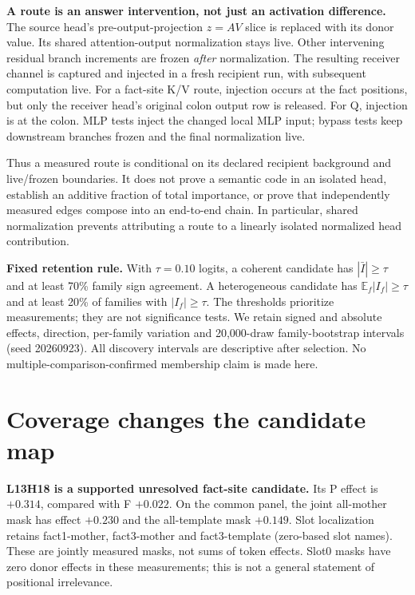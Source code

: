 \documentclass[11pt,a4paper]{article}
\newcommand{\E}{\mathbb{E}}
\begin{document}
\textbf{A route is an answer intervention, not just an activation difference.}
The source head's pre-output-projection $z=AV$ slice is replaced with its donor value. Its shared attention-output normalization stays live. Other intervening residual branch increments are frozen \emph{after} normalization. The resulting receiver channel is captured and injected in a fresh recipient run, with subsequent computation live. For a fact-site K/V route, injection occurs at the fact positions, but only the receiver head's original colon output row is released. For Q, injection is at the colon. MLP tests inject the changed local MLP input; bypass tests keep downstream branches frozen and the final normalization live.

Thus a measured route is conditional on its declared recipient background and live/frozen boundaries. It does not prove a semantic code in an isolated head, establish an additive fraction of total importance, or prove that independently measured edges compose into an end-to-end chain. In particular, shared normalization prevents attributing a route to a linearly isolated normalized head contribution.

\textbf{Fixed retention rule.} With $\tau=0.10$ logits, a coherent candidate has $|\bar I|\ge\tau$ and at least 70\% family sign agreement. A heterogeneous candidate has $\E_f|I_f|\ge\tau$ and at least 20\% of families with $|I_f|\ge\tau$. The thresholds prioritize measurements; they are not significance tests. We retain signed and absolute effects, direction, per-family variation and 20,000-draw family-bootstrap intervals (seed 20260923). All discovery intervals are descriptive after selection. No multiple-comparison-confirmed membership claim is made here.

\section{Coverage changes the candidate map}
\label{sec:coverage}
\begin{table}[htbp]\centering\small

\caption{Outside-inventory candidates on all 89 discovery families. Scope P covers original prompt positions; Scope F is the original colon.}
\end{table}

\textbf{L13H18 is a supported unresolved fact-site candidate.}
Its P effect is $+0.314$, compared with F $+0.022$. On the common panel, the joint all-mother mask has effect $+0.230$ and the all-template mask $+0.149$. Slot localization retains fact1-mother, fact3-mother and fact3-template (zero-based slot names). These are jointly measured masks, not sums of token effects. Slot0 masks have zero donor effects in these measurements; this is not a general statement of positional irrelevance.
\end{document}
